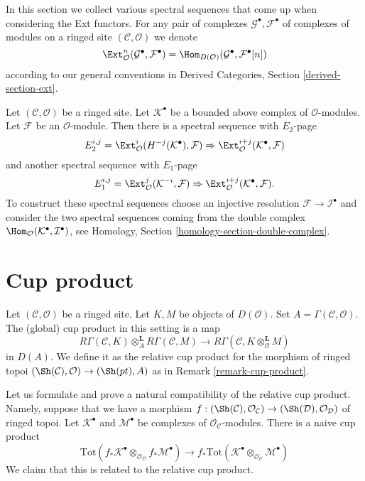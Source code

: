 \noindent
In this section we collect various spectral sequences that come up
when considering the Ext functors. For any pair of complexes
$\mathcal{G}^\bullet, \mathcal{F}^\bullet$ of complexes of modules
on a ringed site $(\mathcal{C}, \mathcal{O})$ we denote
$$
\Ext^n_\mathcal{O}(\mathcal{G}^\bullet, \mathcal{F}^\bullet)
=
\Hom_{D(\mathcal{O})}(\mathcal{G}^\bullet, \mathcal{F}^\bullet[n])
$$
according to our general conventions in
Derived Categories, Section \ref{derived-section-ext}.

\begin{example}
\label{example-hom-complex-into-sheaf}
Let $(\mathcal{C}, \mathcal{O})$ be a ringed site.
Let $\mathcal{K}^\bullet$ be a bounded above complex of $\mathcal{O}$-modules.
Let $\mathcal{F}$ be an $\mathcal{O}$-module. Then there is a
spectral sequence with $E_2$-page
$$
E_2^{i, j} =
\Ext_\mathcal{O}^i(H^{-j}(\mathcal{K}^\bullet), \mathcal{F})
\Rightarrow
\Ext_\mathcal{O}^{i + j}(\mathcal{K}^\bullet, \mathcal{F})
$$
and another spectral sequence with $E_1$-page
$$
E_1^{i, j} =
\Ext_\mathcal{O}^j(\mathcal{K}^{-i}, \mathcal{F})
\Rightarrow
\Ext_\mathcal{O}^{i + j}(\mathcal{K}^\bullet, \mathcal{F}).
$$
To construct these spectral sequences choose an injective resolution
$\mathcal{F} \to \mathcal{I}^\bullet$ and consider the two spectral
sequences coming from the double complex
$\Hom_\mathcal{O}(\mathcal{K}^\bullet, \mathcal{I}^\bullet)$, see
Homology, Section \ref{homology-section-double-complex}.
\end{example}








\section{Cup product}
\label{section-cup-product}

\noindent
Let $(\mathcal{C}, \mathcal{O})$ be a ringed site. Let
$K, M$ be objects of $D(\mathcal{O})$. Set
$A = \Gamma(\mathcal{C}, \mathcal{O})$. The (global) cup product
in this setting is a map
$$
R\Gamma(\mathcal{C}, K) \otimes_A^\mathbf{L}
R\Gamma(\mathcal{C}, M)
\longrightarrow
R\Gamma(\mathcal{C}, K \otimes_\mathcal{O}^\mathbf{L} M)
$$
in $D(A)$. We define it as the relative cup product for
the morphism of ringed topoi
$(\Sh(\mathcal{C}), \mathcal{O}) \to (\Sh(pt), A)$
as in Remark \ref{remark-cup-product}.

\medskip\noindent
Let us formulate and prove a natural compatibility of the
relative cup product. Namely, suppose that we have a morphism
$f : (\Sh(\mathcal{C}), \mathcal{O}_\mathcal{C}) \to
(\Sh(\mathcal{D}), \mathcal{O}_\mathcal{D})$ of ringed topoi.
Let $\mathcal{K}^\bullet$ and $\mathcal{M}^\bullet$
be complexes of $\mathcal{O}_\mathcal{C}$-modules.
There is a naive cup product
$$
\text{Tot}(
f_*\mathcal{K}^\bullet
\otimes_{\mathcal{O}_\mathcal{D}}
f_*\mathcal{M}^\bullet)
\longrightarrow
f_*\text{Tot}(\mathcal{K}^\bullet
\otimes_{\mathcal{O}_\mathcal{C}}
\mathcal{M}^\bullet)
$$
We claim that this is related to the relative cup product.

